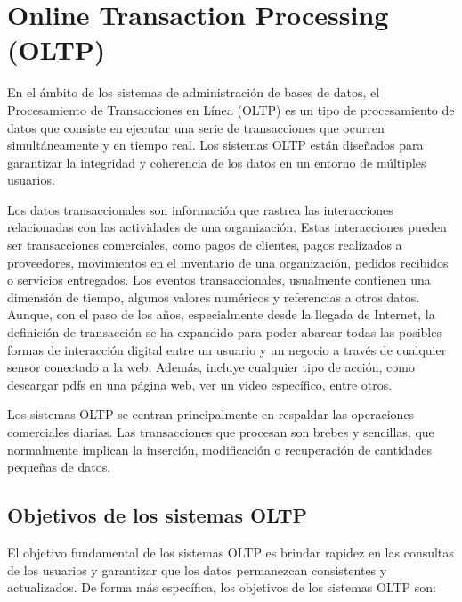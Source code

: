 \section{Online Transaction Processing (OLTP)} \label{section:oltp}

En el ámbito de los sistemas de administración de bases de datos, el Procesamiento de Transacciones en Línea (OLTP) es un 
tipo de procesamiento de datos que consiste en ejecutar una serie de transacciones que ocurren simultáneamente y en 
tiempo real. Los sistemas OLTP están diseñados para garantizar la integridad y coherencia de los datos en un entorno de 
múltiples usuarios.

Los datos transaccionales son información que rastrea las interacciones relacionadas con las actividades de una 
organización. Estas interacciones pueden ser transacciones comerciales, como pagos de clientes, pagos realizados 
a proveedores, movimientos en el inventario de una organización, pedidos recibidos o servicios entregados. Los eventos 
transaccionales, usualmente contienen una dimensión de tiempo, algunos valores 
numéricos y referencias a otros datos\cite{oltpAzure}. Aunque, con el paso de los años, especialmente desde la llegada de 
Internet, la definición de transacción 
se ha expandido para poder abarcar todas las posibles formas de interacción digital entre un usuario y un negocio a través 
de cualquier sensor conectado a la web. Además, incluye cualquier tipo de acción, como descargar pdfs en una 
página web, ver un video específico, entre otros\cite{oltpOracle}.

Los sistemas OLTP se centran principalmente en respaldar las operaciones comerciales diarias. Las transacciones que procesan 
son brebes y sencillas, que normalmente implican la inserción, modificación o recuperación de cantidades pequeñas de datos.

\subsection{Objetivos de los sistemas OLTP}

El objetivo fundamental de los sistemas OLTP es brindar rapidez en las consultas de los usuarios y 
garantizar que los datos permanezcan consistentes y actualizados. De forma m\'as espec\'ifica, los objetivos de 
los sistemas OLTP son: 

